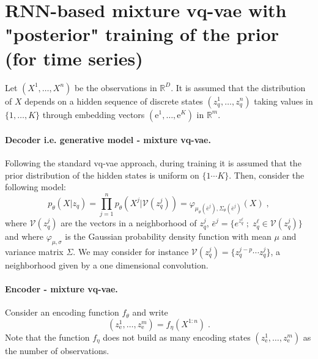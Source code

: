 \documentclass{article}
\newcommand{\rset}{\ensuremath{\mathbb{R}}}
\newcommand{\eqsp}{\;}
\newcommand{\rme}{\mathrm{e}}
\newcommand{\vois}{\mathcal{V}}
\begin{document}
\clearpage
\newpage

\section{RNN-based mixture vq-vae with "posterior" training of the prior (for time series)}
 Let $(X^1,\ldots,X^n)$ be the observations in $\rset^D$.  It is assumed that the distribution of $X$ depends on a hidden sequence of discrete states $(z_q^1,\ldots, z_q^n)$ taking values in $\{1,\ldots,K\}$ through  embedding vectors $(\rme^1,\ldots,\rme^K)$ in $\rset^m$.

\paragraph{Decoder i.e. generative model - mixture vq-vae.}
Following the standard vq-vae approach, during training it is assumed that the prior distribution of the hidden states is uniform on $\{1 \cdots K\}$. %
Then, consider the following model:
$$
p_{\theta}(X|z_q) = \prod_{j=1}^n p_{\theta}(X^j|\vois(z_q^j)) = \varphi_{\mu_\theta(\bar e^j),\Sigma_\theta(\bar e^j)}(X)\eqsp,
$$
where $\vois(z_q^j)$ are the vectors in a neighborhood of  $z_q^j$, $\bar e^j = \{e^{z_q^\ell}\;;\; z_q^\ell\in \vois(z_q^j)\}$ and where $\varphi_{\mu,\sigma}$ is the Gaussian probability density function with mean $\mu$ and variance matrix $\Sigma$. We may consider for instance $\vois(z_q^j) = \{z_q^{j-p} \cdots z_q^j\}$, a neighborhood given by a one dimensional convolution.

\paragraph{Encoder - mixture vq-vae.} Consider an encoding function $f_\theta$ and write
$$
(z_\rme^1,\ldots, z_\rme^m) = f_\eta(X^{1:n})\eqsp.
$$
Note that the function $f_\eta$ does not build as many encoding states $(z_\rme^1,\ldots, z_\rme^m)$ as the number of observations.
\end{document}
